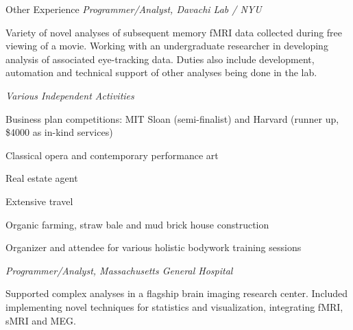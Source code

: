 \begin{rubric}{Other Experience}
\entry*[2005--2006] \emph{Programmer/Analyst, Davachi Lab / NYU}
    \par Variety of novel analyses of subsequent memory fMRI data collected
    during free viewing of a movie.  Working with an undergraduate researcher in
    developing analysis of associated eye-tracking data.  Duties also include
    development, automation and technical support of other analyses being done
    in the lab.

\entry*[2003--2004] \emph{Various Independent Activities}
\begin{compactitem}
    \item Business plan competitions:  MIT Sloan (semi-finalist) and Harvard
        (runner up, \$4000 as in-kind services)
    \item Classical opera and contemporary performance art
    \item Real estate agent
    \item Extensive travel
    \item Organic farming, straw bale and mud brick house construction
    \item Organizer and attendee for various holistic bodywork training sessions
\end{compactitem}

\entry*[2002] \emph{Programmer/Analyst, Massachusetts General Hospital}
    \par Supported complex analyses in a flagship brain imaging research center.
    Included implementing novel techniques for statistics and visualization,
    integrating fMRI, sMRI and MEG.

\end{rubric}
